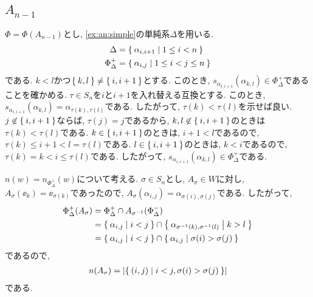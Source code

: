 \subsection{$A_{n-1}$}
\label{ex:an:inversion}
$\Phi=\Phi(A_{n-1})$とし,
\cref{ex:an:simple}の単純系$\Delta$を用いる.
\begin{align*}
  \Delta&=\Set{\alpha_{i,i+1}|1\leq i < n}\\
  \Phi_\Delta^+&=\Set{\alpha_{i,j}|1\leq i<j \leq n}
\end{align*}
である.
$k<l$かつ$\Set{k,l}\neq \Set{i,i+1}$とする.
このとき,
$s_{\alpha_{i,i+1}}(\alpha_{k,l})\in\Phi_\Delta^+$であることを確かめる.
$\tau\in S_n$を$i$と$i+1$を入れ替える互換とする.
このとき, $s_{\alpha_{i,i+1}}(\alpha_{k,l})=\alpha_{\tau(k),\tau(l)}$である.
したがって, $\tau(k)<\tau(l)$を示せば良い.
$j\not\in\Set{i,i+1}$ならば, $\tau(j)=j$であるから,
$k,l\not\in\Set{i,i+1}$のときは$\tau(k)<\tau(l)$である.
$k\in\Set{i,i+1}$のときは,
$i+1< l$であるので, $\tau(k)\leq i+1<l=\tau(l)$である.
$l\in\Set{i,i+1}$のときは,
$k<i$であるので, $\tau(k)= k<i\leq \tau(l)$である.
したがって,
$s_{\alpha_{i,i+1}}(\alpha_{k,l})\in\Phi_\Delta^+$である.

$n(w)=n_{\Phi_\Delta^+}(w)$について考える.
$\sigma\in S_n$とし, $A_\sigma\in W$に対し,
$A_\sigma (\ee_k)=\ee_{\sigma(k)}$であったので,
$A_\sigma(\alpha_{i,j})=\alpha_{\sigma(i),\sigma(j)}$である.
したがって,
\begin{align*}
  \Phi_\Delta^+(A_\sigma)
  &=\Phi_\Delta^+\cap A_{\sigma^{-1}}(\Phi_\Delta^-)\\
  &=\Set{\alpha_{i,j}| i<j}\cap\Set{\alpha_{\sigma^{-1}(k),\sigma^{-1}(l)}| k>l}\\
  &=\Set{\alpha_{i,j}| i<j}\cap\Set{\alpha_{i,j}| \sigma(i)>\sigma(j)}
\end{align*}
であるので,
\begin{align*}
  n(A_\sigma)=\left|\Set{(i,j)|i<j,\sigma(i)>\sigma(j)}\right|
\end{align*}
である.

